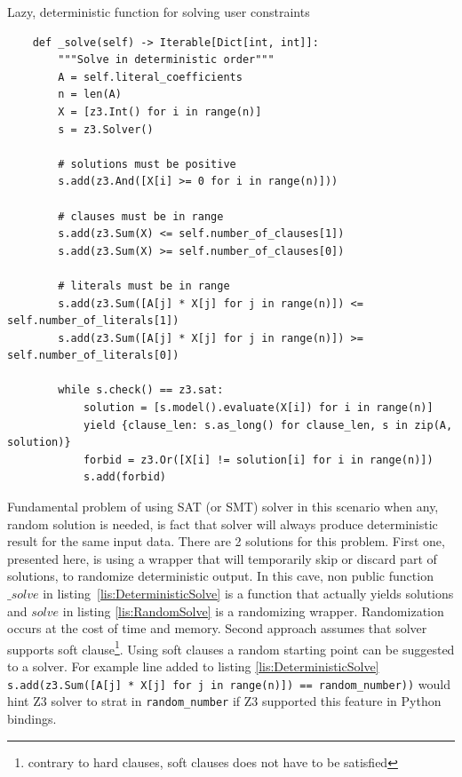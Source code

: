\begin{listing}[H]
  \caption{Lazy, deterministic function for solving user constraints}
  \label{lis:DeterministicSolve}
\begin{verbatim}
    def _solve(self) -> Iterable[Dict[int, int]]:
        """Solve in deterministic order"""
        A = self.literal_coefficients
        n = len(A)
        X = [z3.Int() for i in range(n)]
        s = z3.Solver()

        # solutions must be positive
        s.add(z3.And([X[i] >= 0 for i in range(n)]))

        # clauses must be in range
        s.add(z3.Sum(X) <= self.number_of_clauses[1])
        s.add(z3.Sum(X) >= self.number_of_clauses[0])

        # literals must be in range
        s.add(z3.Sum([A[j] * X[j] for j in range(n)]) <= self.number_of_literals[1])
        s.add(z3.Sum([A[j] * X[j] for j in range(n)]) >= self.number_of_literals[0])

        while s.check() == z3.sat:
            solution = [s.model().evaluate(X[i]) for i in range(n)]
            yield {clause_len: s.as_long() for clause_len, s in zip(A, solution)}
            forbid = z3.Or([X[i] != solution[i] for i in range(n)])
            s.add(forbid)
\end{verbatim}
\end{listing}

Fundamental problem of using SAT (or SMT) solver in this scenario when any, random solution is needed, is fact that solver will always produce deterministic result for the same input data. There are 2 solutions for this problem. First one, presented here, is using a wrapper that will temporarily skip or discard part of solutions, to randomize deterministic output. In this cave, non public function $\_solve$ in listing~\ref{lis:DeterministicSolve} is a function that actually yields solutions and $solve$ in listing \ref{lis:RandomSolve} is a randomizing wrapper. Randomization occurs at the cost of time and memory. Second approach assumes that solver supports soft clause\footnote{contrary to hard clauses, soft clauses does not have to be satisfied}. Using soft clauses a random starting point can be suggested to a solver. For example line added to listing \ref{lis:DeterministicSolve} \texttt{s.add(z3.Sum([A[j] * X[j] for j in range(n)]) == random_number))} would hint Z3 solver to strat in \texttt{random_number} if Z3 supported this feature in Python bindings.

